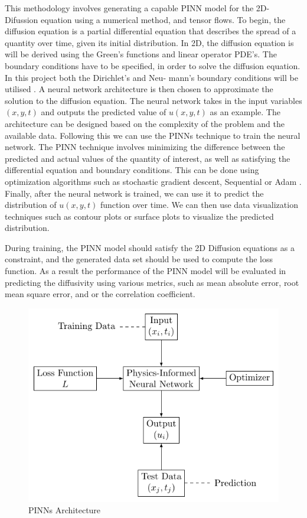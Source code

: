 This methodology involves generating a capable PINN model for the 2D-Difussion equation using a numerical method, and tensor flows. To begin, the diffusion equation is a partial differential equation that describes the spread of a quantity over time, given its initial distribution. In 2D, the diffusion equation is will be derived using the Green's functions \cite{Srivastava_2022} and linear operator PDE's.  The boundary conditions have to be specified,  in order to solve the diffusion equation. In this project both the Dirichlet's and Neu-
mann's boundary conditions will be utilised \cite{Willis1980}. A neural network architecture is then chosen to approximate the solution to the diffusion equation. The neural network takes in the input variables $(x, y, t)$ and outputs the predicted value of $u(x,y,t)$ as an example. The architecture can be designed based on the complexity of the problem and the available data. Following this we can use the PINNs technique to train the neural network. The PINN technique involves minimizing the difference between the predicted and actual values of the quantity of interest, as well as satisfying the differential equation and boundary conditions. This can be done using optimization algorithms such as stochastic gradient descent, Sequential or Adam \cite{FernandezdelaMata2023}. Finally, after the neural network is trained, we can use it to predict the distribution of $u(x,y,t)$ function over time. We can then use data visualization techniques such as contour plots or surface plots to visualize the predicted distribution. 

During training, the PINN model should satisfy the 2D Diffusion equations as a constraint, and the generated data set should be used to compute the loss function. As a result the performance of the PINN model will be evaluated in predicting the diffusivity using various metrics, such as mean absolute error, root mean square error, and or the correlation coefficient.

\begin{figure}[htb!]
\begin{center}
\includegraphics[width=.49\textwidth]{images/arc.pdf}
\vspace*{-8mm}
\caption{PINNs Architecture}
\label{fig:arch}
\end{center}
\end{figure}

